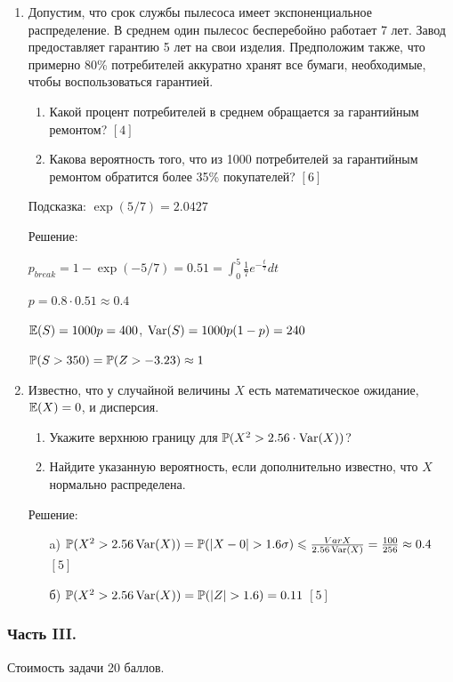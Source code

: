 \documentclass[12pt, a4paper]{article}\usepackage[]{graphicx}\usepackage[]{color}
\begin{document}
\begin{enumerate}
\item Допустим, что срок службы пылесоса имеет экспоненциальное распределение. В среднем один пылесос бесперебойно работает 7 лет. Завод предоставляет гарантию 5 лет на свои изделия. Предположим также, что примерно 80\% потребителей аккуратно хранят все бумаги, необходимые, чтобы воспользоваться гарантией.
\begin{enumerate}
\item Какой процент потребителей в среднем обращается за гарантийным ремонтом? $[4]$
\item Какова вероятность того, что из 1000 потребителей за гарантийным ремонтом обратится более 35\% покупателей? $[6]$
\end{enumerate}
Подсказка: $\exp(5/7)=2.0427$

Решение:

$p_{break}=1-\exp(-5/7)=0.51=\int_{0}^{5}\frac{1}{7}e^{-\frac{t}{7}}dt$

$p=0.8\cdot 0.51\approx 0.4$

$\E(S)=1000p=400$, $\Var(S)=1000p(1-p)=240$

$\P(S>350)=\P(Z>-3.23)\approx 1$

\item Известно, что у случайной величины $X$ есть
математическое ожидание, $\E(X)=0$, и дисперсия.
\begin{enumerate}
\item Укажите верхнюю границу для $\P(X^{2}>2.56\cdot \Var(X))$? %
\item Найдите указанную вероятность, если дополнительно известно, что
$X$ нормально распределена. %
\end{enumerate}

Решение:
\begin{enumerate}
\item[a)] $\P(X^{2}>2.56\Var(X))=\P(|X-0|>1.6\sigma)\le
\frac{Var{X}}{2.56\Var(X)}=\frac{100}{256}\approx 0.4$ $[5]$
\item[б)] $\P(X^{2}>2.56\Var(X))=\P(|Z|>1.6)=0.11$ $[5]$
\end{enumerate}
\end{enumerate}

\subsubsection*{Часть III.}

Стоимость задачи 20 баллов.
\end{document}
